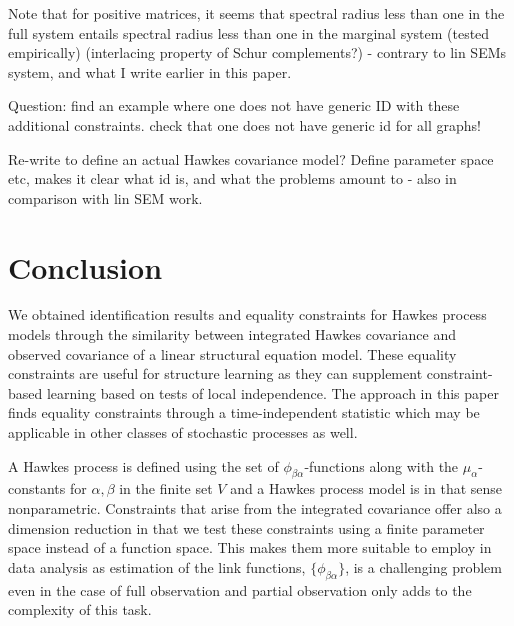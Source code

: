 \documentclass[accepted]{uai2021} %
\begin{document}
Note that for positive matrices, it seems that spectral radius less than one in 
the full system entails spectral radius less than one in the marginal system 
(tested empirically) (interlacing property of Schur complements?) - contrary to 
lin SEMs system, and what I write earlier in this paper.



Question: find an example where one does not have generic ID with these 
additional constraints. check that one does not have generic id for all graphs!

Re-write to define an actual Hawkes covariance model? Define parameter space 
etc, makes it clear what id is, and what the problems amount to - also in 
comparison with lin SEM work.

\section{Conclusion}

We obtained identification results and equality constraints for Hawkes process 
models through the similarity between integrated Hawkes covariance and observed 
covariance of a linear structural equation model. These 
equality constraints are useful for structure learning as they can 
supplement constraint-based learning based on tests of local independence. The 
approach in this paper finds equality constraints through a time-independent 
statistic which may be applicable in other classes of stochastic processes as 
well.

A Hawkes process is defined using the set of $\phi_{\beta\alpha}$-functions 
along 
with the $\mu_\alpha$-constants for $\alpha,\beta$ in the finite set $V$ and a 
Hawkes process model is in that sense nonparametric.  Constraints that arise 
from the integrated covariance offer also a dimension reduction in that we  
test these constraints using a finite parameter space instead of a 
function space. This makes them more suitable to employ in data analysis 
as estimation of the link functions, $\{\phi_{\beta\alpha} \}$, is a 
challenging problem even in the case of full 
observation and partial observation only adds to the 
complexity of this task.





\begin{contributions} %

\end{contributions}
\end{document}
